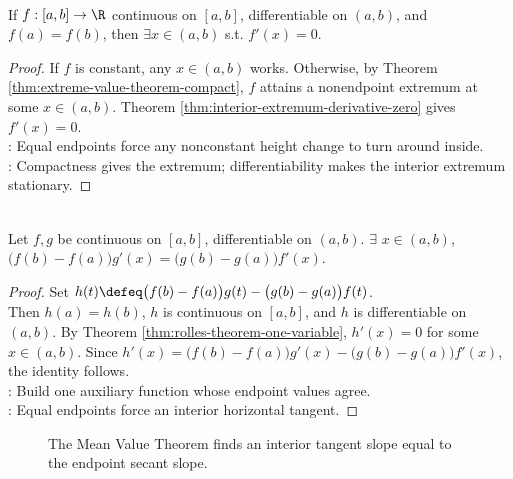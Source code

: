 \begin{theorem} \label{thm:rolles-theorem-one-variable} \\
If $f:[a,b]\to\R$ continuous on $[a,b]$, differentiable on $(a,b)$, and $f(a)=f(b)$, then $\exists x\in(a,b)$ s.t. $f'(x)=0$.
\begin{proof}
If $f$ is constant, any $x\in(a,b)$ works. Otherwise, by Theorem \ref{thm:extreme-value-theorem-compact}, $f$ attains a nonendpoint extremum at some $x\in(a,b)$. Theorem \ref{thm:interior-extremum-derivative-zero} gives $f'(x)=0$.\\
: Equal endpoints force any nonconstant height change to turn around inside.\\
: Compactness gives the extremum; differentiability makes the interior extremum stationary.
\end{proof}
\end{theorem}

\begin{theorem} \label{thm:cauchy-mean-value-theorem} \\
Let $f,g$ be continuous on $[a,b]$, differentiable on $(a,b)$. $\exists$ $x\in(a,b)$, $\bigl(f(b)-f(a)\bigr)g'(x)=\bigl(g(b)-g(a)\bigr)f'(x)$.
\begin{proof}
Set $h(t)\defeq\bigl(f(b)-f(a)\bigr)g(t)-\bigl(g(b)-g(a)\bigr)f(t)$.\\
Then $h(a)=h(b)$, $h$ is continuous on $[a,b]$, and $h$ is differentiable on $(a,b)$. By Theorem \ref{thm:rolles-theorem-one-variable}, $h'(x)=0$ for some $x\in(a,b)$. Since $h'(x)=\bigl(f(b)-f(a)\bigr)g'(x)-\bigl(g(b)-g(a)\bigr)f'(x)$, the identity follows.\\
: Build one auxiliary function whose endpoint values agree.\\
: Equal endpoints force an interior horizontal tangent.
\end{proof}
\end{theorem}

\begin{figure}[H]
  \centering
  
  \caption{The Mean Value Theorem finds an interior tangent slope equal to the endpoint secant slope.}
  \label{fig:mean-value-secant-tangent}
\end{figure}

